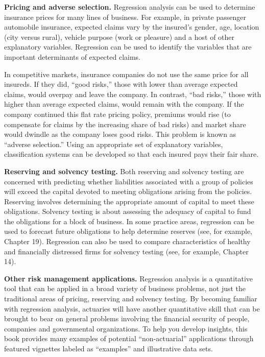 
\textbf{Pricing and adverse selection.} Regression analysis can be
used to determine insurance prices for many lines of business. For
example, in private passenger automobile insurance, expected claims
vary by the insured's gender, age, location (city versus rural),
vehicle purpose (work or pleasure) and a host of other explanatory
variables. Regression can be used to identify the variables that are
important determinants of expected claims.

In competitive markets, insurance companies do not use the same
price for all insureds. If they did, ``good risks,'' those with
lower than average expected claims, would overpay and leave the
company. In contrast, ``bad risks,'' those with higher than average
expected claims, would remain with the company. If the company
continued this flat rate pricing policy, premiums would rise (to
compensate for claims by the increasing share of bad risks) and
market share would dwindle as the company loses good risks. This
problem is known as ``adverse selection.'' Using an appropriate set
of explanatory variables, classification systems can be developed so
that each insured pays their fair share.


\textbf{Reserving and solvency testing.} Both reserving and solvency
testing are concerned with predicting whether liabilities associated
with a group of policies will exceed the capital devoted to meeting
obligations arising from the policies. Reserving involves
determining the appropriate amount of capital to meet these
obligations. Solvency testing is about assessing the adequacy of
capital to fund the obligations for a block of business. In some
practice areas, regression can be used to forecast future
obligations to help determine reserves (see, for example, Chapter
19). Regression can also be used to compare characteristics of
healthy and financially distressed firms for solvency testing (see,
for example, Chapter 14).


\textbf{Other risk management applications.} Regression analysis is
a quantitative tool that can be applied in a broad variety of
business problems, not just the traditional areas of pricing,
reserving and solvency testing. By becoming familiar with regression
analysis, actuaries will have another quantitative skill that can be
brought to bear on general problems involving the financial security
of people, companies and governmental organizations. To help you
develop insights, this book provides many examples of potential
``non-actuarial'' applications through featured vignettes labeled as
``examples'' and illustrative data sets.

